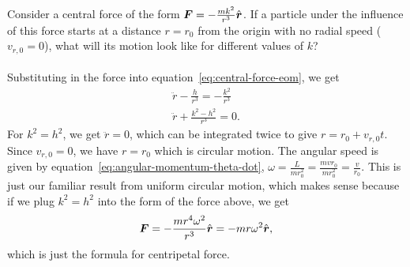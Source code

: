 \documentclass[../classical_mechanics.tex]{subfiles}
\begin{document}
        \begin{example}
            Consider a central force of the form $\boldsymbol{F}=-\frac{mk^2}{r^3}\hat{\boldsymbol{r}}$.
            If a particle under the influence of this force starts at a distance $r=r_0$ from the origin with no radial speed ($v_{r,0}=0$), what will its motion look like for different values of $k$?

            \paragraph{}
            Substituting in the force into equation~\ref{eq:central-force-eom}, we get
            \begin{gather}
                \ddot{r}-\frac{h}{r^3}=-\frac{k^2}{r^3}\\
                \ddot{r}+\frac{k^2-h^2}{r^3}=0.
            \end{gather}
            For $k^2=h^2$, we get $\ddot{r}=0$, which can be integrated twice to give $r=r_0+v_{r,0}t$.
            Since $v_{r,0}=0$, we have $r=r_0$ which is circular motion.
            The angular speed is given by equation~\ref{eq:angular-momentum-theta-dot}, $\omega=\frac{L}{mr_0^2}=\frac{mvr_0}{mr_0^2}=\frac{v}{r_0}$.
            This is just our familiar result from uniform circular motion, which makes sense because if we plug $k^2=h^2$ into the form of the force above, we get
            \begin{equation}
                \boldsymbol{F}=-\frac{mr^4\omega^2}{r^3}\hat{\boldsymbol{r}}=-mr\omega^2\hat{\boldsymbol{r}},
            \end{equation}
            which is just the formula for centripetal force.


\end{example}
\end{document}
